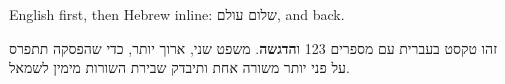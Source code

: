 \documentclass{article}
\begin{document}
English first, then Hebrew inline: \texthebrew{שלום עולם}, and back.

\begin{hebrew}
זהו טקסט בעברית עם מספרים 123 ו\textbf{הדגשה}. משפט שני, ארוך יותר, כדי
שהפסקה תתפרס על פני יותר משורה אחת ותיבדק שבירת השורות מימין לשמאל.
\end{hebrew}
\end{document}
